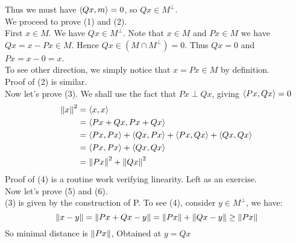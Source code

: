 \begin{proposition}
	Thus we must have $\left<{Qx},{m}\right>=0$, so $Qx\in M^\perp$.\\
	We proceed to prove (1) and (2).\\
	First $x\in M$. We have $Qx\in M^\perp$. Note that $x\in M$ and $Px\in M$ we have $Qx=x-Px\in M$. Hence $Qx\in(M\cap M^\perp)={0}$. Thus $Qx=0$ and $Px=x-0=x$. \\
	To see other direction, we simply notice that $x=Px\in M$ by definition.\\
	Proof of (2) is similar.\\
	Now let's prove (3). We shall use the fact that $Px\perp Qx$, giving $\left<{Px},{Qx}\right>=0$
	\begin{equation}
		\begin{split}
			\left\|{x}\right\|^2&=\left<{x},{x}\right>\\
			&=\left<{Px+Qx},{Px+Qx}\right>\\
			&=\left<{Px},{Px}\right>+\left<{Qx},{Px}\right>+\left<{Px},{Qx}\right>+\left<{Qx},{Qx}\right>\\
			&=\left<{Px},{Px}\right>+\left<{Qx},{Qx}\right>\\
			&=\left\|{Px}\right\|^2+\left\|{Qx}\right\|^2
		\end{split}
	\end{equation}
	Proof of (4) is a routine work verifying linearity. Left as an exercise.\\
	Now let's prove (5) and (6).\\
	(3) is given by the construction of P. To see (4), consider $y\in M^\perp$, we have:
	$$
		\left\|{x-y}\right\|=\left\|{Px+Qx-y}\right\|=\left\|{Px}\right\|+\left\|{Qx-y}\right\|\geq \left\|{Px}\right\|
	$$
	So minimal distance is $\left\|{Px}\right\|$, Obtained at $y=Qx$
\end{proposition}

